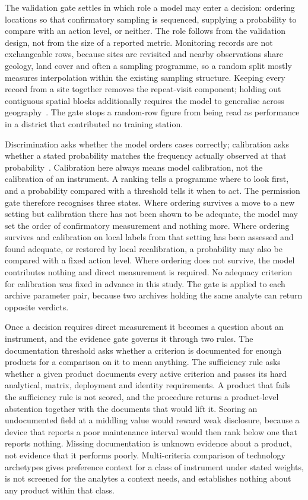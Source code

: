 \documentclass[10pt,letterpaper]{article}
\begin{document}
The validation gate settles in which role a model may enter a decision: ordering locations so that confirmatory sampling is sequenced, supplying a probability to compare with an action level, or neither. The role follows from the validation design, not from the size of a reported metric. Monitoring records are not exchangeable rows, because sites are revisited and nearby observations share geology, land cover and often a sampling programme, so a random split mostly measures interpolation within the existing sampling structure. Keeping every record from a site together removes the repeat-visit component; holding out contiguous spatial blocks additionally requires the model to generalise across geography~\cite{Meyer2019}. The gate stops a random-row figure from being read as performance in a district that contributed no training station.

Discrimination asks whether the model orders cases correctly; calibration asks whether a stated probability matches the frequency actually observed at that probability~\cite{NiculescuMizil2005}. Calibration here always means model calibration, not the calibration of an instrument. A ranking tells a programme where to look first, and a probability compared with a threshold tells it when to act. The permission gate therefore recognises three states. Where ordering survives a move to a new setting but calibration there has not been shown to be adequate, the model may set the order of confirmatory measurement and nothing more. Where ordering survives and calibration on local labels from that setting has been assessed and found adequate, or restored by local recalibration, a probability may also be compared with a fixed action level. Where ordering does not survive, the model contributes nothing and direct measurement is required. No adequacy criterion for calibration was fixed in advance in this study. The gate is applied to each archive \texttimes{} parameter pair, because two archives holding the same analyte can return opposite verdicts.

Once a decision requires direct measurement it becomes a question about an instrument, and the evidence gate governs it through two rules. The documentation threshold asks whether a criterion is documented for enough products for a comparison on it to mean anything. The sufficiency rule asks whether a given product documents every active criterion and passes its hard analytical, matrix, deployment and identity requirements. A product that fails the sufficiency rule is not scored, and the procedure returns a product-level abstention together with the documents that would lift it. Scoring an undocumented field at a middling value would reward weak disclosure, because a device that reports a poor maintenance interval would then rank below one that reports nothing. Missing documentation is unknown evidence about a product, not evidence that it performs poorly. Multi-criteria comparison of technology archetypes gives preference context for a class of instrument under stated weights, is not screened for the analytes a context needs, and establishes nothing about any product within that class.
\end{document}
